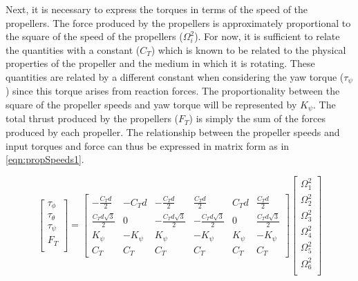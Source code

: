 Next, it is necessary to express the torques in terms of the speed of the propellers. The force produced by the propellers is approximately proportional to the square of the speed of the propellers (\(\Omega_{i}^{2}\)). For now, it is sufficient to relate the quantities with a constant (\(C_{T}\)) which is known to be related to the physical properties of the propeller and the medium in which it is rotating. These quantities are related by a different constant when considering the yaw torque (\(\tau_{\psi}\)) since this torque arises from reaction forces. The proportionality between the square of the propeller speeds and yaw torque will be represented by \(K_{\psi}\). The total thrust produced by the propellers (\(F_{T}\)) is simply the sum of the forces produced by each propeller. The relationship between the propeller speeds and input torques and force can thus be expressed in matrix form as in \eqref{eqn:propSpeeds1}.

\begin{equation}\label{eqn:propSpeeds1}
\begin{bmatrix}
\tau_{\phi}\\
\tau_{\theta}\\
\tau_{\psi}\\
F_{T}\\
\end{bmatrix}
=
\begin{bmatrix}
-\frac{C_{T}d}{2} & -C_{T}d & -\frac{C_{T}d}{2} & \frac{C_{T}d}{2} & C_{T}d & \frac{C_{T}d}{2}\\
    \frac{C_{T}d\sqrt{3}}{2} & 0 & -\frac{C_{T}d\sqrt{3}}{2} & -\frac{C_{T}d\sqrt{3}}{2} & 0 & \frac{C_{T}d\sqrt{3}}{2}\\
    K_{\psi} & -K_{\psi} & K_{\psi} & -K_{\psi} & K_{\psi} & -K_{\psi}\\
    C_{T} & C_{T} & C_{T} & C_{T} & C_{T} & C_{T}
\end{bmatrix}
\begin{bmatrix}
\Omega^{2}_{1}\\
\Omega^{2}_{2}\\
\Omega^{2}_{3}\\
\Omega^{2}_{4}\\
\Omega^{2}_{5}\\
\Omega^{2}_{6}\\
\end{bmatrix}
\end{equation}

